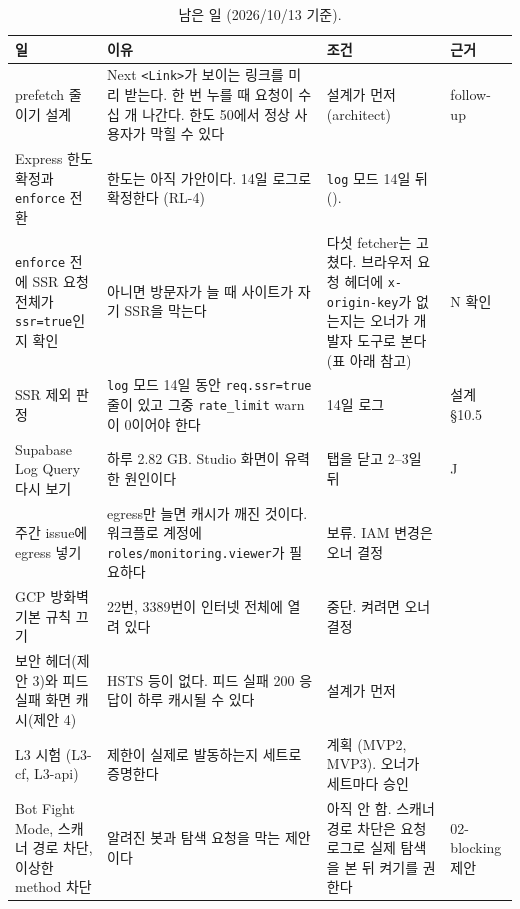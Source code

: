 \begin{table}[H]
  \caption{남은 일 (2026/10/13 기준).}\label{tab:08-open}
  \footnotesize
  \begin{tabularx}{\linewidth}{L{3.6cm} Y L{3.2cm} L{2.2cm}}
    \toprule
    일 & 이유 & 조건 & 근거 \\
    \midrule
    prefetch 줄이기 설계 & Next \texttt{<Link>}가 보이는 링크를 미리 받는다. 한 번 누를 때 요청이 수십 개 나간다. 한도 50에서 정상 사용자가 막힐 수 있다 & 설계가 먼저 (architect) &  follow-up \\
    \midrule
    Express 한도 확정과 \texttt{enforce} 전환 & 한도는 아직 가안이다. 14일 로그로 확정한다 (RL-4) & \texttt{log} 모드 14일 뒤 (). %
 &  \\
    \midrule
    \texttt{enforce} 전에 SSR 요청 전체가 \texttt{ssr=true}인지 확인 & 아니면 방문자가 늘 때 사이트가 자기 SSR을 막는다 & 다섯 fetcher는 고쳤다. 브라우저 요청 헤더에 \texttt{x-origin-key}가 없는지는 오너가 개발자 도구로 본다 (표 아래 참고) & N 확인 \\
    \midrule
    SSR 제외 판정 & \texttt{log} 모드 14일 동안 \texttt{req.ssr=true} 줄이 있고 그중 \texttt{rate\_limit} warn이 0이어야 한다 & 14일 로그 & 설계 \S10.5 \\
    \midrule
    Supabase Log Query 다시 보기 & 하루 2.82 GB. Studio 화면이 유력한 원인이다 & 탭을 닫고 2--3일 뒤 & J \\
    \midrule
    주간 issue에 egress 넣기 & egress만 늘면 캐시가 깨진 것이다. 워크플로 계정에 \texttt{roles/monitoring.viewer}가 필요하다 & 보류. IAM 변경은 오너 결정 &  \\
    \midrule
    GCP 방화벽 기본 규칙 끄기 & 22번, 3389번이 인터넷 전체에 열려 있다 & 중단. 켜려면 오너 결정 &  \\
    \midrule
    보안 헤더(제안 3)와 피드 실패 화면 캐시(제안 4) & HSTS 등이 없다. 피드 실패 200 응답이 하루 캐시될 수 있다 & 설계가 먼저 &  \\
    \midrule
    L3 시험 (L3-cf, L3-api) & 제한이 실제로 발동하는지 세트로 증명한다 & 계획 (MVP2, MVP3). 오너가 세트마다 승인 &  \\
    \midrule
    Bot Fight Mode, 스캐너 경로 차단, 이상한 method 차단 & 알려진 봇과 탐색 요청을 막는 제안이다 & 아직 안 함. 스캐너 경로 차단은 요청 로그로 실제 탐색을 본 뒤 켜기를 권한다 & 02-blocking 제안 \\
    \bottomrule
  \end{tabularx}
\end{table}

